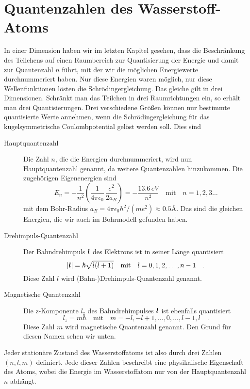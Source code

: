\section{Quantenzahlen des Wasserstoff-Atoms}

In einer Dimension haben wir im letzten Kapitel gesehen, dass die Beschränkung des Teilchens auf einen Raumbereich zur Quantisierung der Energie und damit zur Quantenzahl $n$ führt, mit der wir die möglichen Energiewerte durchnummeriert haben. Nur diese Energien waren möglich, nur diese Wellenfunktionen lösten die Schrödingergleichung. Das gleiche gilt in drei Dimensionen. Schränkt man das Teilchen in drei Raumrichtungen ein, so erhält man drei Quantisierungen. Drei verschiedene Größen können nur bestimmte quantisierte Werte annehmen, wenn die Schrödingergleichung für das kugelsymmetrische Coulombpotential gelöst werden soll. Dies sind
\begin{description}
    \item[Hauptquantenzahl] Die Zahl $n$, die die Energien durchnummeriert, wird nun Hauptquantenzahl genannt, da weitere Quantenzahlen hinzukommen. Die zugehörigen Eigenenergien sind
 \begin{equation}
E_n = - \frac{1}{n^2} \left( \frac{1}{4 \pi \epsilon_0} \, \frac{e^2}{2 a_B }\right) = - \frac{13.6 \, eV}{n^2} \quad \text{mit} \quad n = 1,2, 3 \dots        \label{eq:5_En_Bohr}
    \end{equation}
    mit dem Bohr-Radius $a_B = 4 \pi \epsilon_0 \hbar^2 / (m e^2) \approx 0.5$\AA. Das sind die gleichen Energien, die wir auch im Bohrmodell gefunden haben.

    \item[Drehimpuls-Quantenzahl] Der Bahndrehimpuls $\boldsymbol{l}$ des Elektrons ist in seiner Länge  quantisiert
    \begin{equation}
        | \boldsymbol{l} | = \hbar \sqrt{l (l+1) }  \quad \text{mit} \quad l = 0, 1,2, \dots , n-1 \quad .
    \end{equation}
Diese Zahl $l$ wird (Bahn-)Drehimpuls-Quantenzahl genannt.

\item[Magnetische Quantenzahl] Die z-Komponente $l_z$ des Bahndrehimpulses $\boldsymbol{l}$ ist ebenfalls quantisiert 
\begin{equation}
    l_z = m \hbar   \quad \text{mit} \quad m = -l, -l+1, \dots, 0, \dots, l-1, l \quad .
\end{equation}
Diese Zahl $m$ wird magnetische Quantenzahl genannt. Den Grund für diesen Namen sehen wir unten.

\end{description}
Jeder stationäre Zustand des Wasserstoffatoms ist also durch drei Zahlen $(n,l,m)$ definiert. Jede dieser Zahlen beschreibt eine physikalische Eigenschaft des Atoms, wobei die Energie im Wasserstoffatom nur von der Hauptquantenzahl $n$ abhängt.

